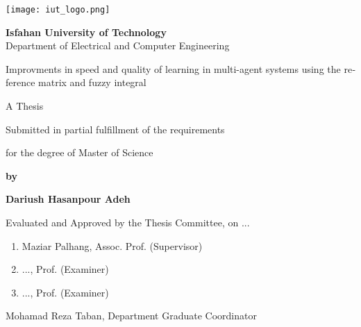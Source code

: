 \thispagestyle{empty}
\begin{latin}
\begin{center}
\texttt{[image: iut\_logo.png]}
\vspace{0.4cm}

{\large\textbf{Isfahan University of Technology}}\\

\vspace{0.4cm}
Department of Electrical and Computer Engineering

\vspace{2.5cm}

{\Huge Improvments in speed and quality of learning in multi-agent systems using the reference matrix and fuzzy integral}

\vspace{1.5cm}

{\large
	A Thesis
	
	\vspace{.3cm}
	
	Submitted in partial fulfillment of the requirements
	
	\vspace{.3cm}
	
	for the degree of Master of Science
}

	\vspace{1.5cm}

{\Large
	\textbf{by}
	
	\vspace{.3cm}
	
	\textbf{Dariush Hasanpour Adeh}
}
\end{center}

\vfill

Evaluated and Approved by the Thesis Committee, on ...
\vspace{0.5cm}

\begin{enumerate}
\item Maziar Palhang, Assoc. Prof. (Supervisor)
\vspace{0.5cm}

\item ..., Prof. (Examiner)
\vspace{0.5cm}

\item ..., Prof. (Examiner)
\vspace{0.5cm}

\end{enumerate}

Mohamad Reza Taban, Department Graduate Coordinator

\pagebreak
\end{latin}

\thispagestyle{empty}
\mbox{}

